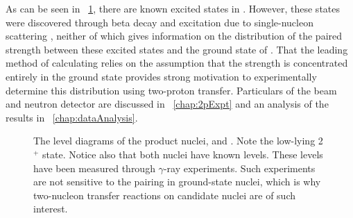 As can be seen in {\fig}~\ref{fig:levelDiagrams}, there are known excited \zp states in \SeProducts.  However, these states were discovered through beta decay and excitation due to single-nucleon scattering \citep{NNDC}, neither of which gives information on the distribution of the paired \zp strength between these excited states and the ground state of \GeTargets.  That the leading method of calculating \NME relies on the assumption that the \zp strength is concentrated entirely in the ground state provides strong motivation to experimentally determine this distribution using two-proton transfer.  Particulars of the beam and neutron detector are discussed in {\chap}~\ref{chap:2pExpt} and an analysis of the results in {\chap}~\ref{chap:dataAnalysis}.
\begin{figure}[hp]
\captionsetup[subfloat]{labelformat=empty}
\centering
{}
\hspace{2cm}
\caption[Level diagram of  and .]{The level diagrams of the product nuclei,  and .  Note the low-lying 2$^+$ state.  Notice also that both nuclei have known \zp levels.  These levels have been measured through $\gamma$-ray experiments.  Such experiments are not sensitive to the pairing in ground-state nuclei, which is why two-nucleon transfer reactions on \zvbb candidate nuclei are of such interest.}
\label{fig:levelDiagrams}
\end{figure}
%
% 
% 
